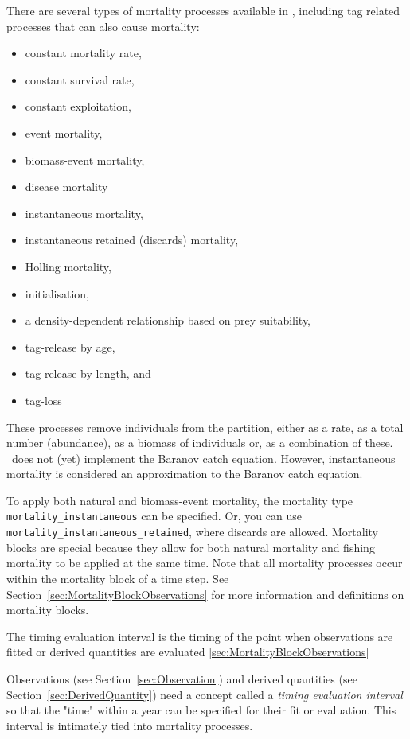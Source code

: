 There are several types of mortality processes available in \CNAME, including tag related processes that can also cause mortality:

\begin{itemize}
	\item constant mortality rate,
    \item constant survival rate,
	\item constant exploitation,
	\item event mortality,
	\item biomass-event mortality,
	\item disease mortality
	\item instantaneous mortality,
	\item instantaneous retained (discards) mortality,
	\item Holling mortality,
	\item initialisation,
	\item a density-dependent relationship based on prey suitability,
	\item tag-release by age,
	\item tag-release by length, and	
	\item tag-loss
\end{itemize}

These processes remove individuals from the partition, either as a rate, as a total number (abundance), as a biomass of individuals or, as a combination of these. \CNAME\ does not (yet) implement the Baranov catch equation. However, instantaneous mortality is considered an approximation to the Baranov catch equation.

To apply both natural and biomass-event mortality, the mortality type \texttt{mortality\_instantaneous} can be specified. Or, you can use \texttt{mortality\_instantaneous\_retained}, where discards are allowed. Mortality blocks are special because they allow for both natural mortality and fishing mortality to be applied at the same time. Note that all mortality processes occur within the mortality block of a time step. See Section~\ref{sec:MortalityBlockObservations} for more information and definitions on mortality blocks.

\textbf{}

The timing evaluation interval is the timing of the point when observations are fitted or derived quantities are evaluated \ref{sec:MortalityBlockObservations}\label{sec:TimingEvaluationInterval}

Observations (see Section~\ref{sec:Observation})  and derived quantities (see Section~\ref{sec:DerivedQuantity}) need a concept called a \emph{timing evaluation interval} so that the "time" within a year can be specified for their fit or evaluation. This interval is intimately tied into mortality processes.

